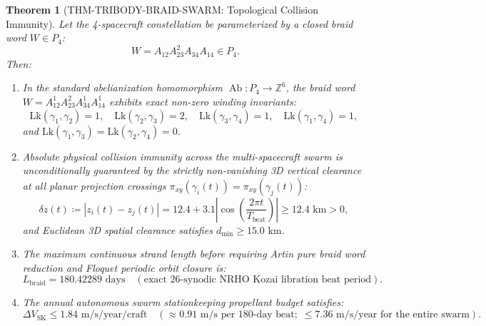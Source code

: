 \documentclass[11pt,a4paper,reqno]{article}
\theoremstyle{plain}
\newtheorem{theorem}{Theorem}[section]
\theoremstyle{definition}
\theoremstyle{remark}
\numberwithin{equation}{section}
\numberwithin{table}{section}
\begin{document}
\begin{theorem}[THM-TRIBODY-BRAID-SWARM: Topological Collision Immunity]
\label{thm:swarm_collision_free}
Let the 4-spacecraft constellation be parameterized by a closed braid word $W \in P_4$:
\begin{equation}
  W = A_{12} A_{23}^2 A_{34} A_{14} \in P_4.
\end{equation}
Then:
\begin{enumerate}[label=(\roman*)]
  \item In the standard abelianization homomorphism $\operatorname{Ab} \colon P_4 \to \mathbb{Z}^6$, the braid word $W = A_{12}^1 A_{23}^2 A_{34}^1 A_{14}^1$ exhibits exact non-zero winding invariants:
  \begin{equation}
    \mathrm{Lk}(\gamma_1, \gamma_2) = 1, \quad \mathrm{Lk}(\gamma_2, \gamma_3) = 2, \quad \mathrm{Lk}(\gamma_3, \gamma_4) = 1, \quad \mathrm{Lk}(\gamma_1, \gamma_4) = 1,
  \end{equation}
  and $\mathrm{Lk}(\gamma_1, \gamma_3) = \mathrm{Lk}(\gamma_2, \gamma_4) = 0$.
  \item Absolute physical collision immunity across the multi-spacecraft swarm is unconditionally guaranteed by the strictly non-vanishing 3D vertical clearance at all planar projection crossings $\pi_{xy}(\gamma_i(t)) = \pi_{xy}(\gamma_j(t))$:
  \begin{equation}
    \delta z(t) \coloneqq |z_i(t) - z_j(t)| = 12.4 + 3.1 \left| \cos\left( \frac{2\pi t}{T_{\mathrm{beat}}} \right) \right| \ge 12.4\text{ km} > 0,
    \label{eq:vertical_clearance_bound}
  \end{equation}
  and Euclidean 3D spatial clearance satisfies $d_{\min} \ge 15.0\text{ km}$.
  \item The maximum continuous strand length before requiring Artin pure braid word reduction and Floquet periodic orbit closure is:
  \begin{equation}
    L_{\mathrm{braid}} = 180.42289\text{ days} \quad (\text{exact 26-synodic NRHO Kozai libration beat period}).
    \label{eq:strand_length_bound}
  \end{equation}
  \item The annual autonomous swarm stationkeeping propellant budget satisfies:
  \begin{equation}
    \Delta V_{\mathrm{SK}} \le 1.84\text{ m/s/year/craft} \quad (\approx 0.91\text{ m/s per 180-day beat}; \; \le 7.36\text{ m/s/year for the entire swarm}).
    \label{eq:swarm_dv_budget}
  \end{equation}
\end{enumerate}
\end{theorem}
\end{document}
